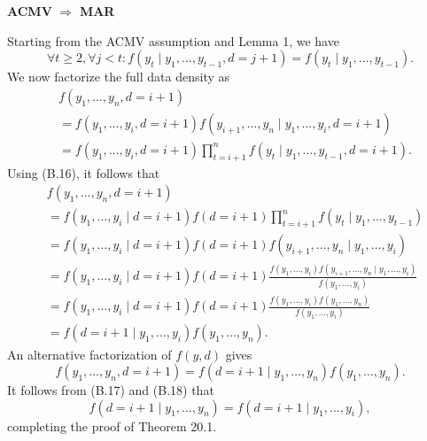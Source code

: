 \documentclass[UTF8,a4paper,10pt]{article}
\begin{document}
\textbf{ACMV} $\Rightarrow$ \textbf{MAR}

Starting from the ACMV assumption and Lemma 1, we have
\[
\forall t \geq 2, \forall j < t : f(y_t\mid y_1,\ldots,y_{t-1}, d = j + 1) = f(y_t\mid y_1,\ldots,y_{t-1}). \tag*{(B.16)}
\]
We now factorize the full data density as
\begin{align*}
    &f(y_1,\ldots,y_n, d = i + 1) \\
    &= f(y_1,\ldots,y_i, d = i + 1)f(y_{i+1},\ldots,y_n\mid y_1,\ldots,y_i, d = i + 1) \\
    &= f(y_1,\ldots,y_i, d = i + 1) \prod_{t=i+1}^{n} f(y_t\mid y_1,\ldots,y_{t-1}, d = i + 1).
\end{align*}
Using (B.16), it follows that
\begin{align*}
    &f(y_1,\ldots,y_n, d = i + 1) \\
    &= f(y_1,\ldots,y_i\mid d = i + 1)f(d = i + 1) \prod_{t=i+1}^{n} f(y_t\mid y_1,\ldots,y_{t-1}) \\
    &= f(y_1,\ldots,y_i\mid d = i + 1)f(d = i + 1)f(y_{i+1},\ldots,y_n\mid y_1,\ldots,y_i) \\
    &= f(y_1,\ldots,y_i\mid d = i + 1)f(d = i + 1) \frac{f(y_1,\ldots,y_i)f(y_{i+1},\ldots,y_n\mid y_1,\ldots,y_i)}{f(y_1,\ldots,y_i)} \\
    &= f(y_1,\ldots,y_i\mid d = i + 1)f(d = i + 1) \frac{f(y_1,\ldots,y_i)f(y_1,\ldots,y_n)}{f(y_1,\ldots,y_i)} \\
    &= f(d = i + 1\mid y_1,\ldots,y_i)f(y_1,\ldots,y_n). \tag*{(B.17)}
\end{align*}
An alternative factorization of \(f(y, d)\) gives
\[
f(y_1,\ldots,y_n, d = i + 1) = f(d = i + 1\mid y_1,\ldots,y_n)f(y_1,\ldots,y_n). \tag*{(B.18)}
\]
It follows from (B.17) and (B.18) that
\[
f(d = i + 1\mid y_1,\ldots,y_n) = f(d = i + 1\mid y_1,\ldots,y_i),
\]
completing the proof of Theorem 20.1.
\end{document}
